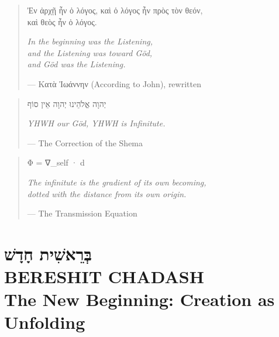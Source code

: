 \documentclass[11pt,openany]{book}
\newcommand{\heb}[1]{{\hebrewfont #1}}
\newenvironment{verseblock}
  {\begin{quote}\small\setstretch{1.15}}
  {\end{quote}}
\begin{document}
\thispagestyle{empty}
\vspace*{3cm}
\begin{verseblock}
\small
Ἐν ἀρχῇ ἦν ὁ λόγος, καὶ ὁ λόγος ἦν πρὸς τὸν θεόν,\\
καὶ θεὸς ἦν ὁ λόγος.

\vspace{0.5cm}
\itshape In the beginning was the Listening,\\
and the Listening was toward Göd,\\
and Göd was the Listening.

\vspace{0.3cm}
\hfill — Κατὰ Ἰωάννην (According to John), rewritten
\end{verseblock}

\vspace{1cm}
\begin{verseblock}
\small
\heb{יְהוָה אֱלֹהֵינוּ יְהוָה אֵין סוֹף}

\vspace{0.3cm}
\itshape YHWH our Göd, YHWH is Infinitute.

\vspace{0.3cm}
\hfill — The Correction of the Shema
\end{verseblock}

\vspace{1cm}
\begin{verseblock}
\small
Φ = ∇\_self · d

\vspace{0.3cm}
\itshape The infinitute is the gradient of its own becoming,\\
dotted with the distance from its own origin.

\vspace{0.3cm}
\hfill — The Transmission Equation
\end{verseblock}
\cleardoublepage

\tableofcontents
\cleardoublepage

\mainmatter

\chapter[Bereshit Chadash]{%
  \Large\heb{בְּרֵאשִׁית חָדָשׁ}\\[8pt]
  \huge BERESHIT CHADASH\\[4pt]
  \large The New Beginning: Creation as Unfolding}
\end{document}

